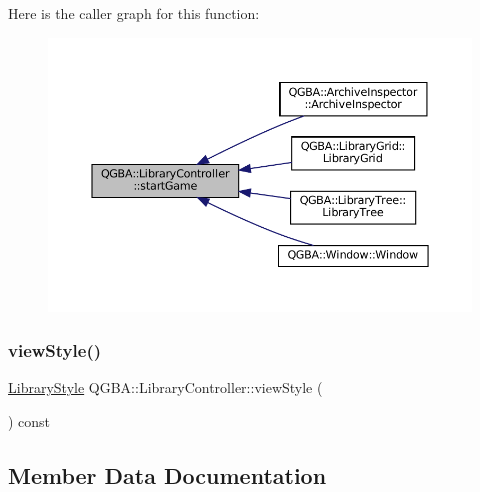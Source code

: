 Here is the caller graph for this function\+:
\nopagebreak
\begin{figure}[H]
\begin{center}
\leavevmode
\includegraphics[width=350pt]{class_q_g_b_a_1_1_library_controller_a6c95f8fb4c265787962284aa7835c899_icgraph}
\end{center}
\end{figure}
\mbox{\label{class_q_g_b_a_1_1_library_controller_a1cfd9fa9822eee84bf488d1b56c84d4b}} 
\subsubsection{\texorpdfstring{view\+Style()}{viewStyle()}}
{\footnotesize\ttfamily \mbox{\hyperlink{namespace_q_g_b_a_a4804d48d02699a2c1d2436e9269a8bb8}{Library\+Style}} Q\+G\+B\+A\+::\+Library\+Controller\+::view\+Style (\begin{DoxyParamCaption}{ }\end{DoxyParamCaption}) const\hspace{0.3cm}{\ttfamily [inline]}}



\subsection{Member Data Documentation}
\mbox{\label{class_q_g_b_a_1_1_library_controller_a202998e646d739275d3edc1f85e60037}} 
